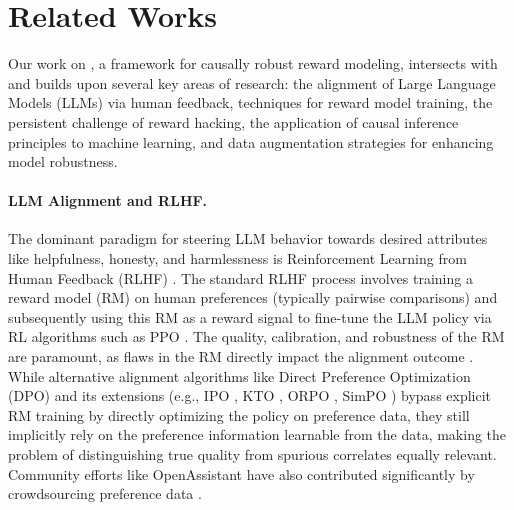 \section{Related Works}
\label{sec:related_works} %

Our work on \carma{}, a framework for causally robust reward modeling, intersects with and builds upon several key areas of research: the alignment of Large Language Models (LLMs) via human feedback, techniques for reward model training, the persistent challenge of reward hacking, the application of causal inference principles to machine learning, and data augmentation strategies for enhancing model robustness.

\paragraph{LLM Alignment and RLHF.}
The dominant paradigm for steering LLM behavior towards desired attributes like helpfulness, honesty, and harmlessness is Reinforcement Learning from Human Feedback (RLHF) \citep{christiano2017deep, stiennon2020learning, ouyang2022training, bai2022training, askell2021general}. The standard RLHF process involves training a reward model (RM) on human preferences (typically pairwise comparisons) and subsequently using this RM as a reward signal to fine-tune the LLM policy via RL algorithms such as PPO \citep{schulman2017proximal}. The quality, calibration, and robustness of the RM are paramount, as flaws in the RM directly impact the alignment outcome \citep{casper2023open}. While alternative alignment algorithms like Direct Preference Optimization (DPO) \citep{rafailov2024direct} and its extensions (e.g., IPO \citep{azar2024general}, KTO \citep{ethayarajh2024kto}, ORPO \citep{hong2024orpo}, SimPO \citep{meng2024simpo}) bypass explicit RM training by directly optimizing the policy on preference data, they still implicitly rely on the preference information learnable from the data, making the problem of distinguishing true quality from spurious correlates equally relevant. Community efforts like OpenAssistant have also contributed significantly by crowdsourcing preference data \citep{köpf2023openassistant}.

